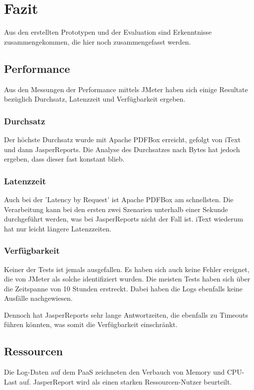 \documentclass[main.tex]{subfiles}
\begin{document}
\chapter{Fazit}

Aus den erstellten Prototypen und der Evaluation sind Erkenntnisse zusammengekommen, die hier noch zusammengefasst werden. 


\section{Performance}
Aus den Messungen der Performance mittels JMeter haben sich einige Resultate  bezüglich Durchsatz, Latenzzeit und Verfügbarkeit ergeben.


\subsection{Durchsatz}

Der höchste Durchsatz wurde mit Apache PDFBox erreicht, gefolgt von iText und dann JasperReports. Die Analyse des Durchsatzes nach Bytes hat jedoch ergeben, dass dieser fast konstant blieb. 

\subsection{Latenzzeit}
Auch bei der 'Latency by Request' ist Apache PDFBox am schnellsten. Die Verarbeitung kann bei den ersten zwei Szenarien unterhalb einer Sekunde durchgeführt werden, was bei JasperReports nicht der Fall ist. iText wiederum hat nur leicht längere Latenzzeiten.

\subsection{Verfügbarkeit}

Keiner der Tests ist jemals ausgefallen. Es haben sich auch keine Fehler ereignet, die von JMeter als solche identifiziert wurden. Die meisten Tests haben sich über die Zeitspanne von 10 Stunden erstreckt. Dabei haben die Logs ebenfalls keine Ausfälle nachgewiesen.

Dennoch hat JasperReports sehr lange Antwortzeiten, die ebenfalls zu Timeouts führen könnten, was somit die Verfügbarkeit einschränkt.


\section{Ressourcen}
Die Log-Daten auf dem PaaS zeichneten den Verbauch von Memory und CPU-Last auf. JasperReport wird als einen starken Ressourcen-Nutzer beurteilt.  
\end{document}
